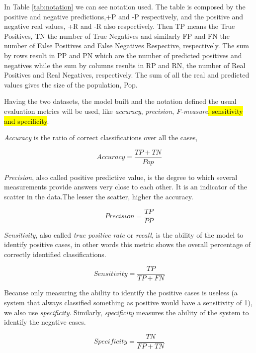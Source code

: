 In Table \ref{tab:notation} we can see notation used. The table is composed by the positive and negative predictions,+P and -P respectively, and the positive and negative real values, +R and -R also respectively. Then TP means the True Positives, TN the number of True Negatives and similarly FP and FN the number of False Positives and False Negatives Respective, respectively. The sum by rows result in PP and PN which are the number of predicted positives and negatives while the sum by columns results in RP and RN, the number of Real Positives and Real Negatives, respectively. The sum of all the real and predicted values gives the size of the population, Pop.

Having the two datasets, the model built and the notation defined the usual evaluation metrics will be used, like \emph{accuracy}, \emph{precision}, \emph{F-measure}\hl{, sensitivity and specificity}.

\emph{Accuracy} is the ratio of correct classifications over all the cases,

\begin{equation}
Accuracy=\frac{TP+TN}{Pop}
\label{eq:accuracy}
\end{equation} 

\emph{Precision}, also called positive predictive value, is the degree to which several measurements provide answers very close to each other. It is an indicator of the scatter in the data.The lesser the scatter, higher the accuracy.

\begin{equation}
Precision= \frac{TP}{PP}
\label{eq:precision}
\end{equation}

\emph{Sensitivity}, also called \emph{true positive rate} or \emph{recall}, is the ability of the model to identify positive cases, in other words this metric shows the overall percentage of correctly identified classifications.

\begin{equation}
Sensitivity= \frac{TP}{TP+FN}
\label{eq:sensitivity}
\end{equation} 

Because only measuring the ability to identify the positive cases is useless (a system that always classified something as positive would have a sensitivity of 1), we also use \emph{specificity}. Similarly, \emph{specificity} measures the ability of the system to identify the negative cases.

\begin{equation}
Specificity= \frac{ TN}{FP+TN}
\label{eq:specificity}
\end{equation}

